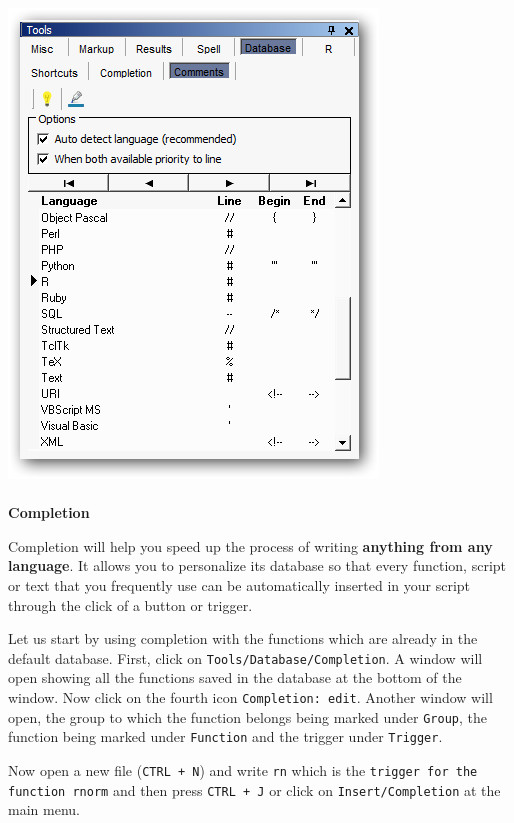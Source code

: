 \includegraphics[scale=0.50]{./res/tools_database_comments.png} \\

\paragraph{}\textbf{Completion}\\

Completion will help you speed up the process of writing \textbf{anything from any language}.
It allows you to personalize its database so that every function, script or text that you
frequently use can be automatically inserted in your script through the click of a button or trigger.


Let us start by using completion with the functions which are already in the default database.
First, click on \texttt{Tools/Database/Completion}. A window will open showing all the functions saved in the
database at the bottom of the window. Now click on the fourth icon \texttt{Completion: edit}.
Another window will open, the group to which the function belongs being marked under \texttt{Group},
the function being marked under \texttt{Function} and the trigger under \texttt{Trigger}.

Now open a new file (\texttt{CTRL + N}) and write \texttt{rn} which is the \texttt{trigger for the function rnorm}
and then press \texttt{CTRL + J} or click on \texttt{Insert/Completion} at the main menu.

